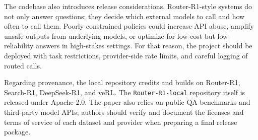 \documentclass{article}
\begin{document}
The codebase also introduces release considerations. Router-R1-style systems do not only answer questions; they decide which external models to call and how often to call them. Poorly constrained policies could increase API abuse, amplify unsafe outputs from underlying models, or optimize for low-cost but low-reliability answers in high-stakes settings. For that reason, the project should be deployed with task restrictions, provider-side rate limits, and careful logging of routed calls.

Regarding provenance, the local repository credits and builds on Router-R1, Search-R1, DeepSeek-R1, and veRL. The \texttt{Router-R1-local} repository itself is released under Apache-2.0. The paper also relies on public QA benchmarks and third-party model APIs; authors should verify and document the licenses and terms of service of each dataset and provider when preparing a final release package.


\end{document}
